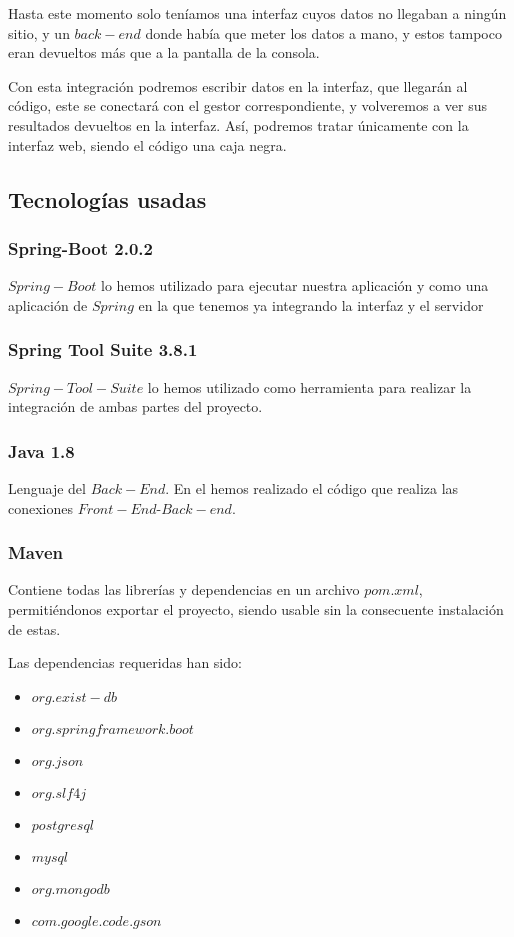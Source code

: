 \documentclass[12pt,a4paper]{article}
\begin{document}
Hasta este momento solo teníamos una interfaz cuyos datos no llegaban a ningún sitio, y un $back-end$ donde había que meter los datos a mano, y estos tampoco eran devueltos más que a la pantalla de la consola.

Con esta integración podremos escribir datos en la interfaz, que llegarán al código, este se conectará con el gestor correspondiente, y volveremos a ver sus resultados devueltos en la interfaz. Así, podremos tratar únicamente con la interfaz web, siendo el código una caja negra.

\subsection{Tecnologías usadas} \label{pto81}
	\subsubsection{Spring-Boot 2.0.2} \label{pto811}
	
	$Spring-Boot$ lo hemos utilizado para ejecutar nuestra aplicación y como una aplicación de $Spring$ en la que tenemos ya integrando la interfaz y el servidor
	\subsubsection{Spring Tool Suite 3.8.1} \label{pto812}
	
	$Spring-Tool-Suite$ lo hemos utilizado como herramienta para realizar la integración de ambas partes del proyecto.
	\subsubsection{Java 1.8} \label{pto813}
	
	Lenguaje del $Back-End$. En el hemos realizado el código que realiza las conexiones $Front-End$-$Back-end$.
	
	\subsubsection{Maven} \label{pto814} 
	
	Contiene todas las librerías y dependencias en un archivo $pom.xml$, permitiéndonos exportar el proyecto, siendo usable sin la consecuente instalación de estas.
	
	Las dependencias requeridas han sido:
	
	\begin{itemize}

	\item $org.exist-db$
	\item $org.springframework.boot$
	\item $org.json$
	\item $org.slf4j$
	\item $postgresql$
	\item $mysql$
	\item $org.mongodb$
	\item $com.google.code.gson$
	\end{itemize}
	
\end{document}
